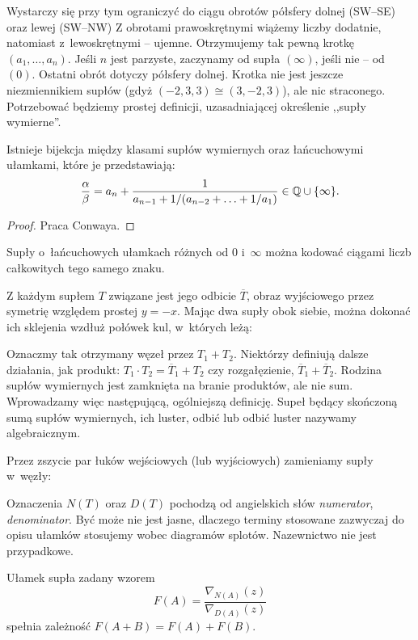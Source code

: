 Wystarczy się przy tym ograniczyć do ciągu obrotów półsfery dolnej (SW--SE) oraz lewej (SW--NW)
Z obrotami prawoskrętnymi wiążemy liczby dodatnie, natomiast z~lewoskrętnymi -- ujemne.
Otrzymujemy tak pewną krotkę $(a_1, \ldots, a_n)$.
Jeśli $n$ jest parzyste, zaczynamy od supła $(\infty)$, jeśli nie -- od $(0)$.
Ostatni obrót dotyczy półsfery dolnej.
Krotka nie jest jeszcze niezmiennikiem supłów (gdyż $(-2,3,3) \cong (3, -2, 3)$), ale nic straconego.
Potrzebować będziemy prostej definicji, uzasadniającej określenie ,,supły wymierne''.

\begin{proposition}
\label{prp:continued_fractions}
    Istnieje bijekcja między klasami supłów wymiernych oraz łańcuchowymi ułamkami, które je przedstawiają:
    \[
        \frac \alpha \beta = a_n + \frac{1}{a_{n-1} + 1 / (a_{n-2} +  \ldots + 1/a_1)} \in \mathbb Q \cup \{\infty\}.
    \]
\end{proposition}

\begin{proof}
    Praca \cite{conway70} Conwaya.
\end{proof}

\begin{proposition}
\label{prp:continued_fractions_2}
    Supły o~łańcuchowych ułamkach różnych od $0$ i~$\infty$ można kodować ciągami liczb całkowitych tego samego znaku.
\end{proposition}

Z każdym supłem $T$ związane jest jego odbicie $\overline T$, obraz wyjściowego przez symetrię względem prostej $y = -x$.
Mając dwa supły obok siebie, można dokonać ich sklejenia wzdłuż połówek kul, w~których leżą:


Oznaczmy tak otrzymany węzeł przez $T_1 + T_2$.
Niektórzy definiują dalsze działania, jak produkt: $T_1 \cdot T_2 = \overline T_1 + T_2$ czy rozgałęzienie, $\overline T_1 + \overline T_2$.
Rodzina supłów wymiernych jest zamknięta na branie produktów, ale nie sum.
Wprowadzamy więc następującą, ogólniejszą definicję.
Supeł będący skończoną sumą supłów wymiernych, ich luster, odbić lub odbić luster nazywamy algebraicznym.

Przez zszycie par łuków wejściowych (lub wyjściowych) zamieniamy supły w~węzły:


Oznaczenia $N(T)$ oraz $D(T)$ pochodzą od angielskich słów \emph{numerator}, \emph{denominator}.
Być może nie jest jasne, dlaczego terminy stosowane zazwyczaj do opisu ułamków stosujemy wobec diagramów splotów.
Nazewnictwo nie jest przypadkowe. %
\begin{proposition}
\label{prp:knot_fraction}
    Ułamek supła zadany wzorem
    \[
        F(A) = \frac{\nabla_{N(A)}(z)}{\nabla_{D(A)}(z)}
    \]
    spełnia zależność $F(A+B) = F(A) + F(B)$.
\end{proposition}

